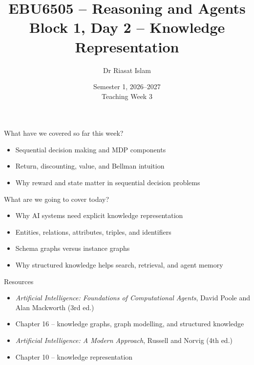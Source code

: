 \documentclass[aspectratio=169]{beamer}
\title[EBU6505 Block 1 Day 2]{EBU6505 -- Reasoning and Agents\\Block 1, Day 2 -- Knowledge Representation}
\author{Dr Riasat Islam}
\institute{Queen Mary University of London}
\date[Teaching Week 3]{Semester 1, 2026--2027 \\ Teaching Week 3}
\newcommand{\defaultdeckrefs}{AIMA4e Ch.10 pp.314--343; Poole3e Ch.16 pp.701--730}
\newcommand{\currentsliderefs}{\defaultdeckrefs}
\newcommand{\setslideref}[1]{\gdef\currentsliderefs{#1}}
\begin{document}
\setslideref{AIMA4e Ch.10 pp.314--343; Poole3e Ch.16 pp.701--730}
\begin{frame}
  \titlepage
\end{frame}

\setslideref{AIMA4e Ch.10 pp.314--343; Poole3e Ch.16 pp.701--730}
\begin{frame}{What have we covered so far this week?}
\begin{itemize}
  \item Sequential decision making and MDP components
  \item Return, discounting, value, and Bellman intuition
  \item Why reward and state matter in sequential decision problems
\end{itemize}
\end{frame}

\setslideref{AIMA4e Ch.10 pp.314--343; Poole3e Ch.16 pp.701--730}
\begin{frame}{What are we going to cover today?}
\begin{itemize}
  \item Why AI systems need explicit knowledge representation
  \item Entities, relations, attributes, triples, and identifiers
  \item Schema graphs versus instance graphs
  \item Why structured knowledge helps search, retrieval, and agent memory
\end{itemize}
\end{frame}

\setslideref{AIMA4e Ch.10 pp.314--343; Poole3e Ch.16 pp.701--730}
\begin{frame}{Resources}
\begin{itemize}
  \item \textit{Artificial Intelligence: Foundations of Computational Agents}, David Poole and Alan Mackworth (3rd ed.)
  \item Chapter 16 -- knowledge graphs, graph modelling, and structured knowledge
  \item \textit{Artificial Intelligence: A Modern Approach}, Russell and Norvig (4th ed.)
  \item Chapter 10 -- knowledge representation
\end{itemize}
\end{frame}
\end{document}
